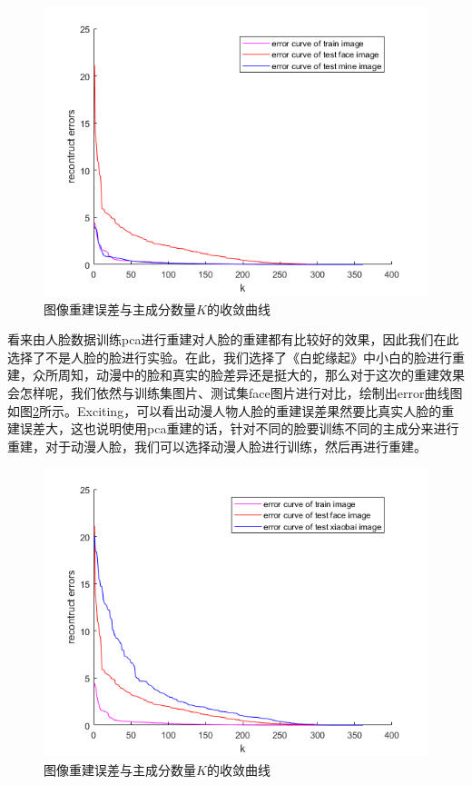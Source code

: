 \documentclass[cn]{elegantbook}
\begin{document}
\begin{figure}[!ht]
	\centering
	\includegraphics[width=\textwidth]{images/error2}
	\caption{\label{fig2}图像重建误差与主成分数量$K$的收敛曲线}
\end{figure}

看来由人脸数据训练pca进行重建对人脸的重建都有比较好的效果，因此我们在此选择了不是人脸的脸进行实验。在此，我们选择了《白蛇缘起》中小白的脸进行重建，众所周知，动漫中的脸和真实的脸差异还是挺大的，那么对于这次的重建效果会怎样呢，我们依然与训练集图片、测试集face图片进行对比，绘制出error曲线图如图\ref{fig3}所示。Exciting，可以看出动漫人物人脸的重建误差果然要比真实人脸的重建误差大，这也说明使用pca重建的话，针对不同的脸要训练不同的主成分来进行重建，对于动漫人脸，我们可以选择动漫人脸进行训练，然后再进行重建。

\begin{figure}[!ht]
	\centering
	\includegraphics[width=\textwidth]{images/error3}
	\caption{\label{fig3}图像重建误差与主成分数量$K$的收敛曲线}
\end{figure}
\end{document}
